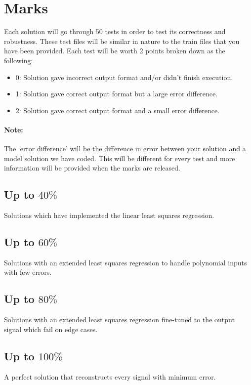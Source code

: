 \documentclass[12pt]{article}
\begin{document}
\section{Marks}
\label{sec:marks}
Each solution will go through 50 tests in order to test its correctness and robustness.
These test files will be similar in nature to the train files that you have been provided.
Each test will be worth 2 points broken down as the following: 
\begin{itemize}
    \item 0: Solution gave incorrect output format and/or didn’t finish execution. 
    \item 1: Solution gave correct output format but a large error difference. 
    \item 2: Solution gave correct output format and a small error difference. 
\end{itemize}
\paragraph{Note:} The ‘error difference’ will be the difference in error between your solution and a model solution we have coded.
This will be different for every test and more information will be provided when the marks are released. 

\subsection{Up to $40\%$}
Solutions which have implemented the linear least squares regression.

\subsection{Up to $60\%$}
Solutions with an extended least squares regression to handle polynomial inputs with few errors.

\subsection{Up to $80\%$}
Solutions with an extended least squares regression fine-tuned to the output signal which fail on edge cases.

\subsection{Up to $100\%$}
A perfect solution that reconstructs every signal with minimum error.
\end{document}
